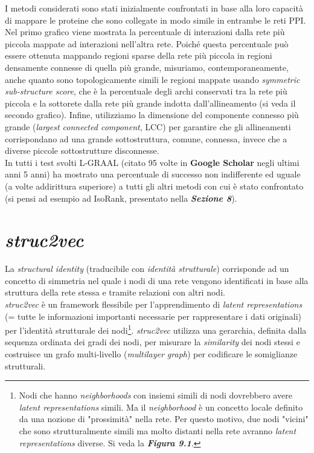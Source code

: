\documentclass[11pt]{article}
\begin{document}
I metodi considerati sono stati inizialmente confrontati in base alla loro capacità di mappare le proteine che sono collegate in modo simile in entrambe le reti PPI. Nel primo grafico viene mostrata la percentuale di interazioni dalla rete più piccola mappate ad interazioni nell'altra rete. Poiché questa percentuale può essere ottenuta mappando regioni sparse della rete più piccola in regioni densamente connesse di quella più grande, misuriamo, contemporaneamente, anche quanto sono topologicamente simili  le regioni mappate usando \textit{symmetric sub-structure score}, che è la percentuale degli archi conservati tra la rete più piccola e la sottorete dalla rete più grande indotta dall'allineamento (si veda il secondo grafico). Infine, utilizziamo la dimensione del componente connesso più grande (\textit{largest connected component}, LCC) per garantire che gli allineamenti corrispondano ad una grande sottostruttura, comune, connessa, invece che a diverse piccole sottostrutture disconnesse.\\

In tutti i test svolti L-GRAAL (citato 95 volte in \textbf{Google Scholar} negli ultimi anni 5 anni) ha mostrato una percentuale di successo non indifferente ed uguale (a volte addirittura superiore) a tutti gli altri metodi con cui è stato confrontato (si pensi ad esempio ad IsoRank, presentato nella \textit{\textbf{Sezione 8}}).

\pagebreak
\section{\textit{struc2vec}}
La \textit{structural identity} (traducibile con \textit{identità strutturale}) corrisponde ad un concetto di simmetria nel quale i nodi di una rete vengono identificati in base alla struttura della rete stessa e tramite relazioni con altri nodi. \\

\textit{struc2vec} è un framework flessibile per l'apprendimento di \textit{latent representations} (= tutte le informazioni importanti necessarie per rappresentare i dati originali) per l'identità strutturale dei nodi\footnote{Nodi che hanno \textit{neighborhoods} con insiemi simili di nodi dovrebbero avere \textit{latent representations} simili. Ma il \textit{neighborhood} è un concetto locale definito da una nozione di "prossimità" nella rete. Per questo motivo, due nodi "vicini" che sono strutturalmente simili ma molto distanti nella rete avranno \textit{latent representations} diverse. Si veda la \textit{\textbf{Figura 9.1}}.}. \textit{struc2vec} utilizza una gerarchia, definita dalla sequenza ordinata dei gradi dei nodi, per misurare la \textit{similarity} dei nodi stessi e costruisce un grafo multi-livello (\textit{multilayer graph}) per codificare le somiglianze strutturali.
\end{document}
